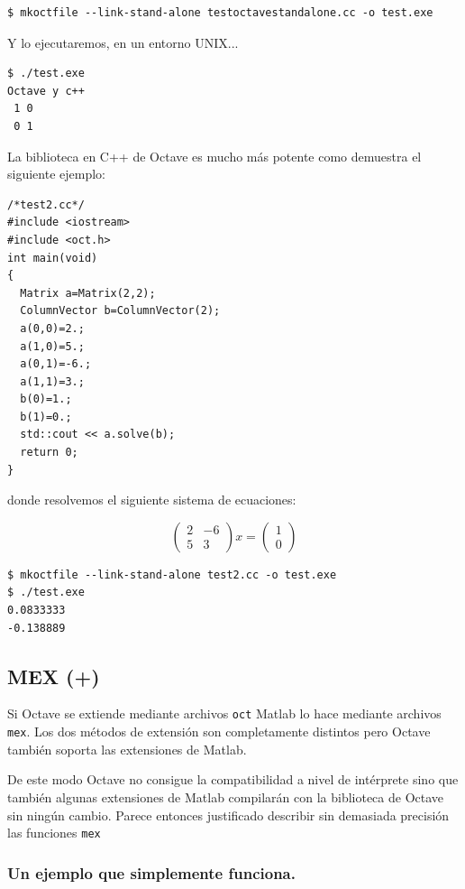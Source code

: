 \begin{verbatim}
$ mkoctfile --link-stand-alone testoctavestandalone.cc -o test.exe
\end{verbatim}
Y lo ejecutaremos, en un entorno UNIX...

\begin{verbatim}
$ ./test.exe
Octave y c++
 1 0
 0 1
\end{verbatim}

La biblioteca en C++ de Octave es mucho más potente como demuestra el
siguiente ejemplo:

\begin{verbatim}
/*test2.cc*/
#include <iostream>
#include <oct.h>
int main(void)
{
  Matrix a=Matrix(2,2);
  ColumnVector b=ColumnVector(2);
  a(0,0)=2.;
  a(1,0)=5.;
  a(0,1)=-6.;
  a(1,1)=3.;
  b(0)=1.;
  b(1)=0.;
  std::cout << a.solve(b);
  return 0;
}
\end{verbatim}
donde resolvemos el siguiente sistema de ecuaciones:

$$
\left(\begin{array}{cc}
    2 & -6\\
    5 & 3\end{array}\right)x= \left(\begin{array}{c}
    1\\
    0\end{array}\right)$$


\begin{verbatim}
$ mkoctfile --link-stand-alone test2.cc -o test.exe
$ ./test.exe 
0.0833333 
-0.138889 
\end{verbatim}

\subsection{MEX  (+)}

Si Octave se extiende mediante archivos \texttt{oct} Matlab lo hace
mediante archivos \texttt{mex}. Los dos métodos de extensión son
completamente distintos pero Octave también soporta las extensiones de
Matlab.

De este modo Octave no consigue la compatibilidad a nivel de
intérprete sino que también algunas extensiones de Matlab compilarán
con la biblioteca de Octave sin ningún cambio. Parece entonces
justificado describir sin demasiada precisión las funciones
\texttt{mex}

\subsubsection{Un ejemplo que simplemente funciona.}

